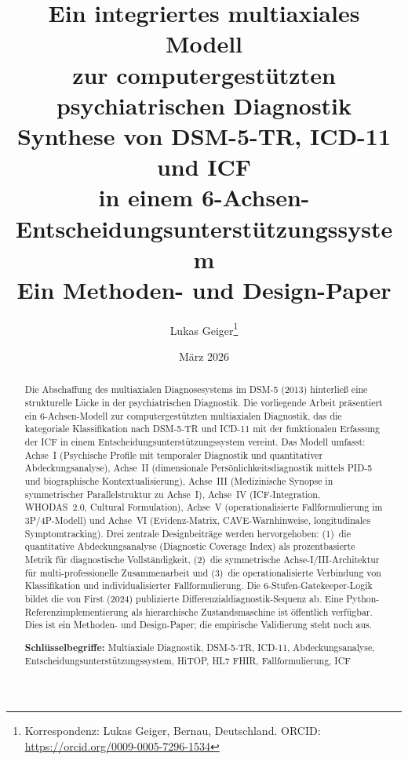 \documentclass[11pt,a4paper]{article}
\begin{document}

\title{\textbf{\huge Ein integriertes multiaxiales Modell\\zur computergest\"utzten psychiatrischen Diagnostik}\\[0.5em]
\Large Synthese von DSM-5-TR, ICD-11 und ICF\\in einem 6-Achsen-Entscheidungsunterst\"utzungssystem\\[0.3em]
\large Ein Methoden- und Design-Paper}

\author[1]{Lukas Geiger\thanks{Korrespondenz: Lukas Geiger, Bernau, Deutschland. ORCID: \url{https://orcid.org/0009-0005-7296-1534}}}

\date{M\"arz 2026}

\maketitle

\begin{abstract}
\noindent Die Abschaffung des multiaxialen Diagnosesystems im DSM-5 (2013) hinterlie\ss{} eine strukturelle L\"ucke in der psychiatrischen Diagnostik. Die vorliegende Arbeit pr\"asentiert ein 6-Achsen-Modell zur computergest\"utzten multiaxialen Diagnostik, das die kategoriale Klassifikation nach DSM-5-TR und ICD-11 mit der funktionalen Erfassung der ICF in einem Entscheidungsunterst\"utzungssystem vereint. Das Modell umfasst: Achse~I (Psychische Profile mit temporaler Diagnostik und quantitativer Abdeckungsanalyse), Achse~II (dimensionale Pers\"onlichkeitsdiagnostik mittels PID-5 und biographische Kontextualisierung), Achse~III (Medizinische Synopse in symmetrischer Parallelstruktur zu Achse~I), Achse~IV (ICF-Integration, WHODAS~2.0, Cultural Formulation), Achse~V (operationalisierte Fallformulierung im 3P/4P-Modell) und Achse~VI (Evidenz-Matrix, CAVE-Warnhinweise, longitudinales Symptomtracking). Drei zentrale Designbeitr\"age werden hervorgehoben: (1)~die quantitative Abdeckungsanalyse (Diagnostic Coverage Index) als prozentbasierte Metrik f\"ur diagnostische Vollst\"andigkeit, (2)~die symmetrische Achse-I/III-Architektur f\"ur multi-professionelle Zusammenarbeit und (3)~die operationalisierte Verbindung von Klassifikation und individualisierter Fallformulierung. Die 6-Stufen-Gatekeeper-Logik bildet die von First (2024) publizierte Differenzialdiagnostik-Sequenz ab. Eine Python-Referenzimplementierung als hierarchische Zustandsmaschine ist \"offentlich verf\"ugbar. Dies ist ein Methoden- und Design-Paper; die empirische Validierung steht noch aus.

\vspace{0.5em}
\noindent \textbf{Schl\"usselbegriffe:} Multiaxiale Diagnostik, DSM-5-TR, ICD-11, Abdeckungsanalyse, Entscheidungsunterst\"utzungssystem, HiTOP, HL7 FHIR, Fallformulierung, ICF
\end{abstract}
\end{document}
